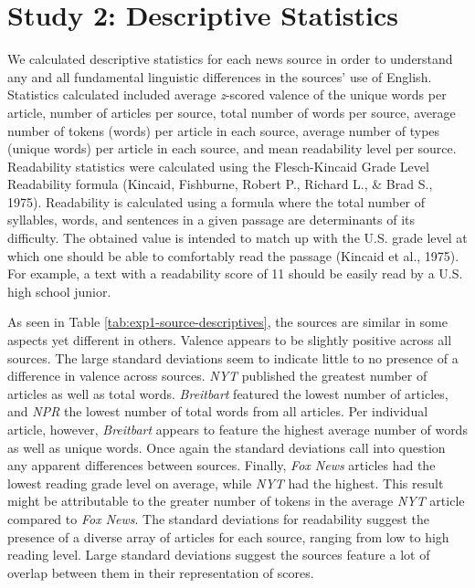 \documentclass[
  man,floatsintext]{apa6}
\begin{document}
\newpage

\appendix


\section{Study 2: Descriptive Statistics}\label{study-2-descriptive-statistics}

We calculated descriptive statistics for each news source in order to
understand any and all fundamental linguistic differences in the
sources' use of English. Statistics calculated included average
\emph{z}-scored valence of the unique words per article, number of articles
per source, total number of words per source, average number of tokens
(words) per article in each source, average number of types (unique
words) per article in each source, and mean readability level per
source. Readability statistics were calculated using the Flesch-Kincaid
Grade Level Readability formula (Kincaid, Fishburne, Robert P., Richard L., \& Brad S., 1975). Readability is
calculated using a formula where the total number of syllables, words,
and sentences in a given passage are determinants of its difficulty. The
obtained value is intended to match up with the U.S. grade level at
which one should be able to comfortably read the passage (Kincaid et al., 1975).
For example, a text with a readability score of 11 should be easily read
by a U.S. high school junior.

As seen in Table \ref{tab:exp1-source-descriptives}, the sources are
similar in some aspects yet different in others. Valence appears to be
slightly positive across all sources. The large standard deviations seem
to indicate little to no presence of a difference in valence across
sources. \emph{NYT} published the greatest number of articles as well as
total words. \emph{Breitbart} featured the lowest number of articles, and
\emph{NPR} the lowest number of total words from all articles. Per individual
article, however, \emph{Breitbart} appears to feature the highest average
number of words as well as unique words. Once again the standard
deviations call into question any apparent differences between sources.
Finally, \emph{Fox News} articles had the lowest reading grade level on
average, while \emph{NYT} had the highest. This result might be attributable
to the greater number of tokens in the average \emph{NYT} article compared to
\emph{Fox News}. The standard deviations for readability suggest the presence
of a diverse array of articles for each source, ranging from low to high
reading level. Large standard deviations suggest the sources feature a
lot of overlap between them in their representation of scores.
\end{document}
